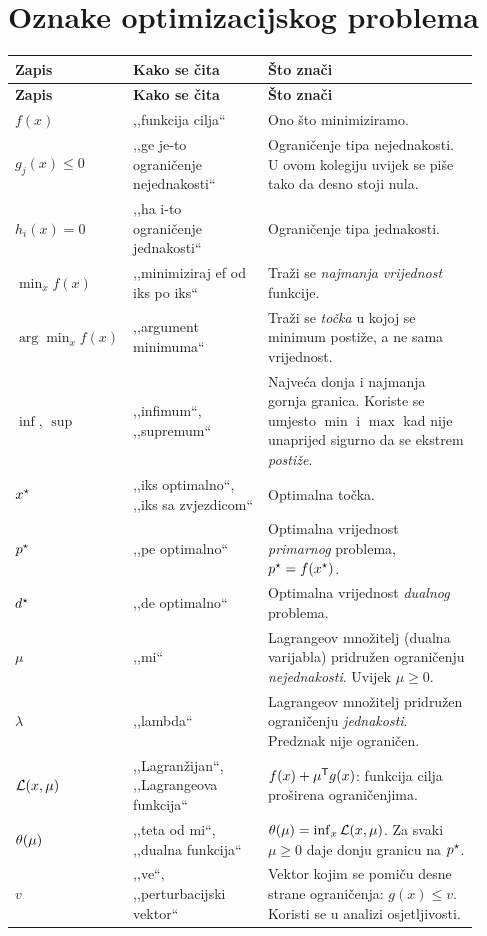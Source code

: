 \section{Oznake optimizacijskog problema}
\label{sec:oznake-optimizacije}

\begin{longtable}{@{}p{0.14\linewidth} p{0.30\linewidth} p{0.48\linewidth}@{}}
\toprule
\textbf{Zapis} & \textbf{Kako se čita} & \textbf{Što znači} \\
\midrule
\endfirsthead
\toprule
\textbf{Zapis} & \textbf{Kako se čita} & \textbf{Što znači} \\
\midrule
\endhead
$f(x)$ & ,,funkcija cilja`` & Ono što minimiziramo. \\[4pt]
$g_j(x) \leq 0$ & ,,ge je-to ograničenje nejednakosti`` & Ograničenje tipa nejednakosti. U ovom kolegiju uvijek se piše tako da desno stoji nula. \\[4pt]
$h_i(x) = 0$ & ,,ha i-to ograničenje jednakosti`` & Ograničenje tipa jednakosti. \\[4pt]
$\min_x f(x)$ & ,,minimiziraj ef od iks po iks`` & Traži se \emph{najmanja vrijednost} funkcije. \\[4pt]
$\arg\min_x f(x)$ & ,,argument minimuma`` & Traži se \emph{točka} u kojoj se minimum postiže, a ne sama vrijednost. \\[4pt]
$\inf$, $\sup$ & ,,infimum``, ,,supremum`` & Najveća donja i najmanja gornja granica. Koriste se umjesto $\min$ i $\max$ kad nije unaprijed sigurno da se ekstrem \emph{postiže}. \\[4pt]
$x^{\star}$ & ,,iks optimalno``, ,,iks sa zvjezdicom`` & Optimalna točka. \\[4pt]
$p^{\star}$ & ,,pe optimalno`` & Optimalna vrijednost \emph{primarnog} problema, $p^{\star} = f(x^{\star})$. \\[4pt]
$d^{\star}$ & ,,de optimalno`` & Optimalna vrijednost \emph{dualnog} problema. \\[4pt]
$\mu$ & ,,mi`` & Lagrangeov množitelj (dualna varijabla) pridružen ograničenju \emph{nejednakosti}. Uvijek $\mu \geq 0$. \\[4pt]
$\lambda$ & ,,lambda`` & Lagrangeov množitelj pridružen ograničenju \emph{jednakosti}. Predznak nije ograničen. \\[4pt]
$\mathcal{L}(x,\mu)$ & ,,Lagranžijan``, ,,Lagrangeova funkcija`` & $f(x) + \mu^{\mathsf{T}} g(x)$: funkcija cilja proširena ograničenjima. \\[4pt]
$\theta(\mu)$ & ,,teta od mi``, ,,dualna funkcija`` & $\theta(\mu) = \inf_x \mathcal{L}(x,\mu)$. Za svaki $\mu \geq 0$ daje donju granicu na $p^{\star}$. \\[4pt]
$v$ & ,,ve``, ,,perturbacijski vektor`` & Vektor kojim se pomiču desne strane ograničenja: $g(x) \leq v$. Koristi se u analizi osjetljivosti. \\
\bottomrule
\end{longtable}


